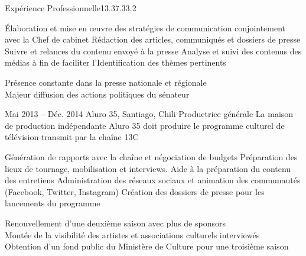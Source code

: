 \documentclass[30pt, french]{tccv}
\begin{document}
\begin{upshape}
\begin{flat_frame}{Expérience Professionnelle}{13.3}{7.3}{3.2}{}
\begin{eventlist}
    \setlength{\parskip}{-10pt}
    \begin{itemize}
      \setlength\itemsep{-3pt} 
      \cvitem[\checkmark] Élaboration et mise en œuvre des stratégies de communication conjointement avec la Chef de cabinet
      \cvitem[\checkmark] Rédaction des articles, communiqués et dossiers de presse
      \cvitem[\checkmark] Suivre et relances du contenu envoyé à la presse
      \cvitem[\checkmark] Analyse et suivi des contenus des médias à fin de faciliter l'Identification des thèmes pertinents
      
    \end{itemize}     
 Présence constante dans la presse nationale et régionale  \\
\mission{}            Majeur diffusion des actions politiques du sénateur
    
    
    
\setlength{\parskip}{0pt}        
\item{Mai 2013 -- Déc. 2014}
     {Aluro 35, Santiago, Chili}
     {Productrice générale}
     \fontsize{9pt}{1em}\color{text}\bodyfontlight\upshape\selectfont
%
 La maison de production indépendante Aluro 35 doit produire le programme culturel de télévision  transmit par la chaîne 13C \\
    
    \setlength{\parskip}{-10pt}
    \begin{itemize}
      \setlength\itemsep{-3pt} 
      \cvitem[\checkmark] Génération de rapports avec la chaîne et négociation de budgets                       
      \cvitem[\checkmark] Préparation des lieux de tournage, mobilisation et interviews. Aide à la préparation du contenu des entretiens 
      \cvitem[\checkmark] Administration des réseaux sociaux et animation des communautés (Facebook, Twitter, Instagram)                 
      \cvitem[\checkmark] Création des dossiers de presse pour les lancements du programme                                             
    \end{itemize}     
 Renouvellement d'une deuxième saison avec plus de sponsors \\
\mission{}	     Montée de la visibilité des artistes et associations culturels interviewés \\
\mission{}           Obtention d’un fond public du Ministère de Culture pour une troisième saison  \\





\end{eventlist}
\end{flat_frame}
\end{upshape}
\end{document}
